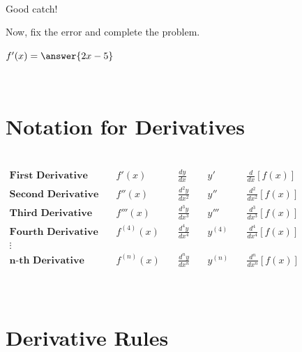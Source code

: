 \documentclass{ximera}
\begin{document}
\begin{problem}
\begin{problem}
~ \\[2em]

\begin{feedback}[correct]
Good catch!   
\end{feedback}

\begin{problem}
Now, fix the error and complete the problem.  


$f'(x) = \answer{2x - 5}$

\end{problem}
\end{problem}
\end{problem}


~ \\[2em]

\section*{Notation for Derivatives}

~ \\[2em]

$
\begin{array}{lllll}
\textbf{First Derivative} & \quad f'(x) & \quad \displaystyle \frac{dy}{dx} & \quad y' & \quad \displaystyle \frac{d}{dx} [f(x)] \\[4ex]

\textbf{Second Derivative} & \quad f''(x) & \quad \displaystyle \frac{d^2y}{dx^2} & \quad y'' & \quad \displaystyle \frac{d^2}{dx^2} [f(x)] \\[4ex]

\textbf{Third Derivative} & \quad f'''(x) & \quad \displaystyle \frac{d^3y}{dx^3} & \quad y''' & \quad \displaystyle \frac{d^3}{dx^3} [f(x)] \\[4ex]

\textbf{Fourth Derivative} & \quad f^{(4)}(x) & \quad \displaystyle \frac{d^4y}{dx^4} & \quad y^{(4)} & \quad \displaystyle \frac{d^4}{dx^4} [f(x)] \\[2ex]

\vdots & & & & \\[2ex]

\textbf{n-th Derivative} & \quad f^{(n)}(x) & \quad \displaystyle \frac{d^ny}{dx^n} & \quad y^{(n)} & \quad \displaystyle \frac{d^n}{dx^n} [f(x)] \\
\end{array}
$

~ \\[2em]

\section*{Derivative Rules}
\end{document}
